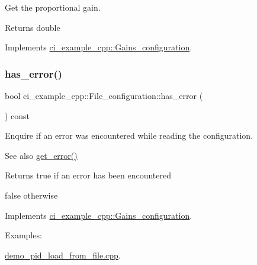 Get the proportional gain. 

\begin{DoxyReturn}{Returns}
double 
\end{DoxyReturn}


Implements \hyperlink{classci__example__cpp_1_1Gains__configuration_add5ce511c797cd688e12cee09d8ec0b8}{ci\+\_\+example\+\_\+cpp\+::\+Gains\+\_\+configuration}.

\mbox{\label{classci__example__cpp_1_1File__configuration_aa3cae137be3b59e61d13c2a9b1ec8b6a}} 
\subsubsection{\texorpdfstring{has\+\_\+error()}{has\_error()}}
{\footnotesize\ttfamily bool ci\+\_\+example\+\_\+cpp\+::\+File\+\_\+configuration\+::has\+\_\+error (\begin{DoxyParamCaption}{ }\end{DoxyParamCaption}) const\hspace{0.3cm}{\ttfamily [virtual]}}



Enquire if an error was encountered while reading the configuration. 

\begin{DoxySeeAlso}{See also}
\hyperlink{classci__example__cpp_1_1File__configuration_aaf67f7d61d467563a4dce8aa69306a6a}{get\+\_\+error()} 
\end{DoxySeeAlso}
\begin{DoxyReturn}{Returns}
true if an error has been encountered 

false otherwise 
\end{DoxyReturn}


Implements \hyperlink{classci__example__cpp_1_1Gains__configuration_ae075925f60288519f8a4fcb477453a66}{ci\+\_\+example\+\_\+cpp\+::\+Gains\+\_\+configuration}.

\begin{Desc}
\item[Examples\+: ]\par
\hyperlink{demo_pid_load_from_file_8cpp-example}{demo\+\_\+pid\+\_\+load\+\_\+from\+\_\+file.\+cpp}.\end{Desc}


